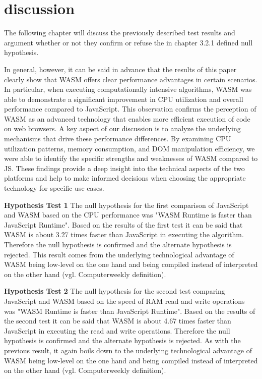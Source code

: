 \newpage
\section{discussion} \label{discussion}
The following chapter will discuss the previously described test results and argument whether or not they confirm or refuse the in chapter 3.2.1 defined null hypothesis. 

In general, however, it can be said in advance that the results of this paper clearly show that WASM offers clear performance advantages in certain scenarios. In particular, when executing computationally intensive algorithms, WASM was able to demonstrate a significant improvement in CPU utilization and overall performance compared to JavaScript. This observation confirms the perception of WASM as an advanced technology that enables more efficient execution of code on web browsers. 
A key aspect of our discussion is to analyze the underlying mechanisms that drive these performance differences. By examining CPU utilization patterns, memory consumption, and DOM manipulation efficiency, we were able to identify the specific strengths and weaknesses of WASM compared to JS. These findings provide a deep insight into the technical aspects of the two platforms and help to make informed decisions when choosing the appropriate technology for specific use cases.

\textbf{Hypothesis Test 1} \newline
The null hypothesis for the first comparison of JavaScript and WASM based on the CPU performance was "WASM Runtime is faster than JavaScript Runtime". Based on the results of the first test it can be said that WASM is about 3.27 times faster than JavaScript in executing the algorithm. Therefore the null hypothesis is confirmed and the alternate hypothesis is rejected. This result comes from the underlying technological advantage of WASM being low-level on the one hand and being compiled instead of interpreted on the other hand (vgl. Computerweekly definition).

\textbf{Hypothesis Test 2} \newline
The null hypothesis for the second test comparing JavaScript and WASM based on the speed of RAM read and write operations was "WASM Runtime is faster than JavaScript Runtime". Based on the results of the second test it can be said that WASM is about 4.67 times faster than JavaScript in executing the read and write operations. Therefore the null hypothesis is confirmed and the alternate hypothesis is rejected. As with the previous result, it again boils down to the underlying technological advantage of WASM being low-level on the one hand and being compiled instead of interpreted on the other hand (vgl. Computerweekly definition).

